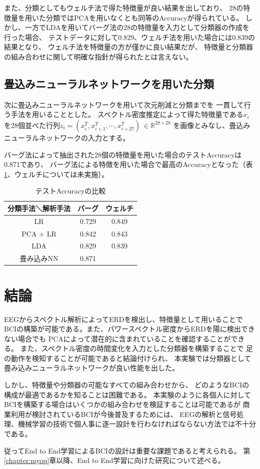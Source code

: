 また、分類としてもウェルチ法で得た特徴量が良い結果を出しており、
28の特徴量を用いた分類ではPCAを用いなくとも同等のAccuracyが得られている。
しかし、一方でLDAを用いてバーグ法の28の特徴量を入力として分類器の作成を行った場合、
テストデータに対して0.829、ウェルチ法を用いた場合には0.839の結果となり、
ウェルチ法を特徴量の方が僅かに良い結果だが、
特徴量と分類器の組み合わせに関して明確な指針が得られたとは言えない。

\subsection{畳込みニューラルネットワークを用いた分類}
次に畳込みニューラルネットワークを用いて次元削減と分類までを
一貫して行う手法を用いることとした。
スペクトル密度推定によって得た特徴量である\(x_i\)を28個並べた行列\(z_i=(x_i^T, x_{i+1}^T,\cdots, x_{i+27}^T)\ \in \mathbb R^{28\times 28}\)
を画像とみなし、畳込みニューラルネットワークの入力とする。

バーグ法によって抽出された28個の特徴量を用いた場合のテストAccuracyは0.871であり、
バーグ法による特徴を用いた場合で最高のAccuracyとなった（表\ref{table:accuracies}、ウェルチについては未実施）。

\begin{table}[t]
    \centering
    \caption{テストAccuracyの比較}
        \begin{tabular}{|c|c|c|} \hline
            分類手法＼解析手法 & バーグ & ウェルチ \\ \hline
            LR &  0.729  & 0.849  \\ \hline
            PCA + LR & 0.842  & 0.843  \\  \hline
            LDA & 0.829  & 0.839  \\  \hline
            畳み込みNN & 0.871  &  \\ \hline
        \end{tabular}
    \label{table:accuracies}
\end{table}

\section{結論}
EEGからスペクトル解析によってERDを検出し、特徴量として用いることで
BCIの構築が可能である。また、パワースペクトル密度からERDを陽に検出できない場合でも
PCAによって潜在的に含まれていることを確認することができる。
また、スペクトル密度の時間変化を入力とした分類器を構築することで
足の動作を検知することが可能であると結論付けられ、
本実験では分類器として畳み込みニューラルネットワークが良い性能を出した。

しかし、特徴量や分類器の可能なすべての組み合わせから、
どのようなBCIの構成が最適であるかを知ることは困難である。
本実験のように各個人に対して
BCIを構築する場合はいくつかの組み合わせを検証することは可能であるが
商業利用が検討されているBCIが今後普及するためには、
EEGの解析と信号処理、機械学習の技術で個人事に逐一設計を行わなければならない方法では不十分である。

従ってEnd to End学習によるBCIの設計は重要な課題であると考えられる。
第\ref{chapter:myop}章以降、End to End学習に向けた研究について述べる。